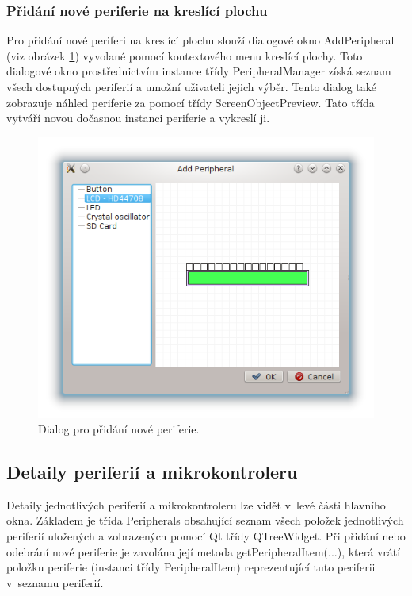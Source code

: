 \subsubsection{Přidání nové periferie na kreslící plochu}

Pro přidání nové periferi na kreslící plochu slouží dialogové okno AddPeripheral (viz obrázek \ref{fig:addperipheral}) vyvolané pomocí kontextového menu kreslící plochy. Toto dialogové okno prostřednictvím instance třídy PeripheralManager získá seznam všech dostupných periferií a umožní uživateli jejich výběr. Tento dialog také zobrazuje náhled periferie za pomocí třídy ScreenObjectPreview. Tato třída vytváří novou dočasnou instanci periferie a vykreslí ji.

\begin{figure}[ht]
\centering
\includegraphics[trim=0cm 0cm 0cm 0cm]{fig/addperipheral}
\caption{Dialog pro přidání nové periferie.}
\label{fig:addperipheral}
\end{figure}

\subsection{Detaily periferií a mikrokontroleru}
\label{detaily_per}

Detaily jednotlivých periferií a mikrokontroleru lze vidět v~levé části hlavního okna. Základem je třída Peripherals obsahující seznam všech položek jednotlivých periferií uložených a zobrazených pomocí Qt třídy QTreeWidget. Při přidání nebo odebrání nové periferie je zavolána její metoda getPeripheralItem(...), která vrátí položku periferie (instanci třídy PeripheralItem) reprezentující tuto periferii v~seznamu periferií.

